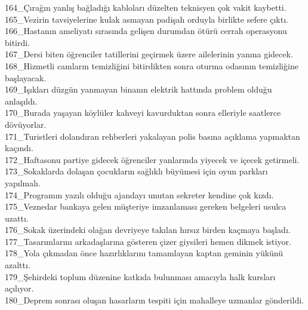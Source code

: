 \begin{myparindent}{0pt}
164\_Çırağın yanlış bağladığı kabloları düzelten teknisyen çok vakit kaybetti. \\
165\_Vezirin tavsiyelerine kulak asmayan padişah orduyla birlikte sefere çıktı. \\
166\_Hastanın ameliyatı sırasında gelişen durumdan ötürü cerrah operasyonu bitirdi. \\
167\_Dersi biten öğrenciler tatillerini geçirmek üzere ailelerinin yanına gidecek. \\
168\_Hizmetli camların temizliğini bitirdikten sonra oturma odasının temizliğine başlayacak. \\
169\_Işıkları düzgün yanmayan binanın elektrik hattında problem olduğu anlaşıldı. \\
170\_Burada yaşayan köylüler kahveyi kavurduktan sonra elleriyle saatlerce dövüyorlar. \\
171\_Turistleri dolandıran rehberleri yakalayan polis basına açıklama yapmaktan kaçındı. \\
172\_Haftasonu partiye gidecek öğrenciler yanlarında yiyecek ve içecek getirmeli. \\
173\_Sokaklarda dolaşan çocukların sağlıklı büyümesi için oyun parkları yapılmalı. \\
174\_Programın yazılı olduğu ajandayı unutan sekreter kendine çok kızdı. \\
175\_Veznedar bankaya gelen müşteriye imzanlaması gereken belgeleri usulca uzattı. \\
176\_Sokak üzerindeki olağan devriyeye takılan hırsız birden kaçmaya başladı. \\
177\_Tasarımlarını arkadaşlarına gösteren çizer giysileri hemen dikmek istiyor. \\
178\_Yola çıkmadan önce hazırlıklarını tamamlayan kaptan geminin yükünü azalttı. \\
179\_Şehirdeki toplum düzenine katkıda bulunması amacıyla halk kursları açılıyor. \\
180\_Deprem sonrası oluşan hasarların tespiti için mahalleye uzmanlar gönderildi. \\
\end{myparindent}
